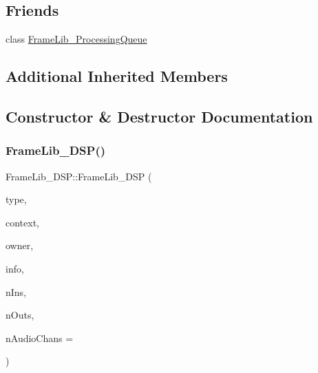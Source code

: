 \subsection*{Friends}
\begin{DoxyCompactItemize}
\item 
class \hyperlink{class_frame_lib___d_s_p_a71376d0a2e88daa0b12d080d6b5184a5}{Frame\+Lib\+\_\+\+Processing\+Queue}
\end{DoxyCompactItemize}
\subsection*{Additional Inherited Members}


\subsection{Constructor \& Destructor Documentation}
\mbox{\label{class_frame_lib___d_s_p_a3f5e89a0ad938ff8e928ec3374b6cf3c}} 
\subsubsection{\texorpdfstring{Frame\+Lib\+\_\+\+D\+S\+P()}{FrameLib\_DSP()}}
{\footnotesize\ttfamily Frame\+Lib\+\_\+\+D\+S\+P\+::\+Frame\+Lib\+\_\+\+D\+SP (\begin{DoxyParamCaption}\item[{\hyperlink{_frame_lib___types_8h_a842c5e2e69277690b064bf363c017980}{Object\+Type}}]{type,  }\item[{\hyperlink{class_frame_lib___context}{Frame\+Lib\+\_\+\+Context}}]{context,  }\item[{void $\ast$}]{owner,  }\item[{\hyperlink{class_frame_lib___parameters_1_1_info}{Frame\+Lib\+\_\+\+Parameters\+::\+Info} $\ast$}]{info,  }\item[{unsigned long}]{n\+Ins,  }\item[{unsigned long}]{n\+Outs,  }\item[{unsigned long}]{n\+Audio\+Chans = {} }\end{DoxyParamCaption})}

\mbox{\label{class_frame_lib___d_s_p_a2cf489678b72fe7e46956e69fac182ed}} 
